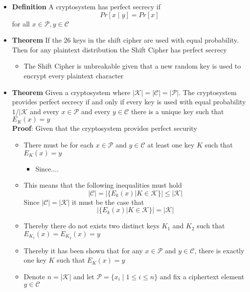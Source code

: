 \begin{itemize}
\begin{equation*}
  \end{equation*}
  \item \textbf{Definition} A cryptosystem has perfect secrecy if 
  \begin{equation*}
    Pr[x \mid y] = Pr [x]
  \end{equation*}
  for all $x \in \mathcal P, y \in \mathcal C$
  \item \textbf{Theorem} If the 26 keys in the shift cipher are used with equal probability. Then for any plaintext distribution the Shift Cipher has perfect secrecy
  \begin{itemize}
	  \item The Shift Cipher is unbreakable given that a new random key is used to encrypt every plaintext character
  \end{itemize}
  \item \textbf{Theorem} Given a cryptosystem where $|\mathcal K| = | \mathcal C| = |\mathcal P|$. The cryptosystem provides perfect secrecy if and only if every key is used with equal probability $1/|\mathcal K$ and every $x \in \mathcal P$ and every $y \in \mathcal C$ there is a unique key such that $E_K(x) = y$ \smallskip \\
  \textbf{Proof}: Given that the cryptosystem provides perfect security 
  \begin{itemize}
  	\item There must be for each $x \in \mathcal P$ and $y \in \mathcal C$ at least one key $K$ such that $E_K(x) = y$ 
    \begin{itemize}
    	\item Since....
    \end{itemize}
    \item This means that the following inequalities must hold
    \begin{equation*}
      |\mathcal C| = |\{E_k(x) | K \in \mathcal K \}| \leq |\mathcal K|
    \end{equation*} 
    Since $|\mathcal C| = |\mathcal K|$ it must be the case that 
    \begin{equation*}
      |\{E_k(x) | K \in \mathcal K \}| = |\mathcal K|
    \end{equation*}
    \item Thereby there do not exists two distinct keys $K_1$ and $K_2$ such that $E_{K_1}(x) = E_{K_2}(x) = y$
    \item Thereby it has been shown that for any $x \in \mathcal P$ and $y \in \mathcal C$, there is exactly one key $K$ such that $E_K(x) = y$ 
    \item Denote $n = |\mathcal K|$ and let  $\mathcal P = \{x_i \mid 1 \leq i \leq n\}$ and fix a ciphertext element $y \in \mathcal C$ 

\end{itemize}
\end{itemize}
